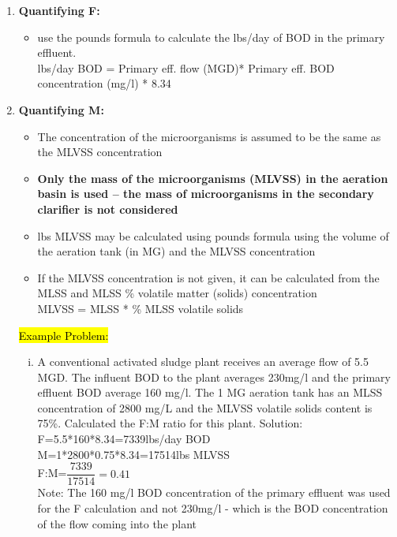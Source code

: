 \begin{enumerate}
\item \textbf{Quantifying F:}
\begin{itemize}
\item use the pounds formula to calculate the lbs/day of BOD in the primary effluent.\\
lbs/day BOD = Primary eff. flow (MGD)* Primary eff. BOD concentration (mg/l) * 8.34\\
\end{itemize}
\item \textbf{Quantifying M:}
\begin{itemize}
\item The concentration of the microorganisms is assumed to be the same as the MLVSS concentration
\item \textbf{Only the mass of the microorganisms (MLVSS) in the aeration basin is used – the mass of microorganisms in the secondary clarifier is not considered} 
\item lbs MLVSS may be calculated using pounds formula using the volume of the aeration tank (in MG) and the MLVSS concentration
\item If the MLVSS concentration is not given, it can be calculated from the MLSS and MLSS \% volatile matter (solids) concentration\\
MLVSS = MLSS * \% MLSS volatile solids
\end{itemize}


\hl{Example Problem:}\\
\begin{enumerate}[i.]
\item A conventional activated sludge plant receives an average flow of 5.5 MGD. The influent BOD to the plant averages 230mg/l and the primary effluent BOD average 160 mg/l. The 1 MG aeration tank has an MLSS concentration of 2800 mg/L and the MLVSS volatile solids content is 75\%. Calculated the F:M ratio for this plant.
\vspace{0.3cm}
Solution:\\
\vspace{0.3cm}
F=5.5*160*8.34=7339lbs/day BOD\\
M=1*2800*0.75*8.34=17514lbs MLVSS\\
F:M=$\dfrac{7339}{17514}=\boxed{0.41}$\\

Note:  The 160 mg/l BOD concentration of the primary effluent was used for the F calculation and not 230mg/l - which is the BOD concentration of the flow coming into the plant\\
\end{enumerate}


\end{enumerate}
